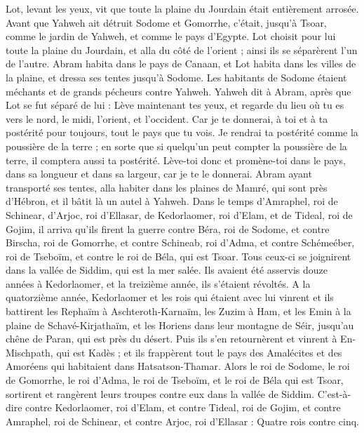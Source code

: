 \begin{multicols}{2}
Lot, levant les yeux, vit que toute la plaine du Jourdain était entièrement arrosée. Avant que Yahweh ait détruit Sodome et Gomorrhe, c’était, jusqu'à Tsoar, comme le jardin de Yahweh, et comme le pays d'Egypte.
Lot choisit pour lui toute la plaine du Jourdain, et alla du côté de l’orient ; ainsi ils se séparèrent l'un de l'autre.
Abram habita dans le pays de Canaan, et Lot habita dans les villes de la plaine, et dressa ses tentes jusqu'à Sodome.
Les habitants de Sodome étaient méchants et de grands pécheurs contre Yahweh.
Yahweh dit à Abram, après que Lot se fut séparé de lui : Lève maintenant tes yeux, et regarde du lieu où tu es vers le nord, le midi, l'orient, et l'occident.
Car je te donnerai, à toi et à ta postérité pour toujours, tout le pays que tu vois.
Je rendrai ta postérité comme la poussière de la terre ; en sorte que si quelqu'un peut compter la poussière de la terre, il comptera aussi ta postérité.
Lève-toi donc et promène-toi dans le pays, dans sa longueur et dans sa largeur, car je te le donnerai.
Abram ayant transporté ses tentes, alla habiter dans les plaines de Mamré, qui sont près d’Hébron, et il bâtit là un autel à Yahweh.
\VerseOne{}Dans le temps d'Amraphel, roi de Schinear, d'Arjoc, roi d'Ellasar, de Kedorlaomer, roi d'Elam, et de Tideal, roi de Gojim,
il arriva qu’ils firent la guerre contre Béra, roi de Sodome, et contre Birscha, roi de Gomorrhe, et contre Schineab, roi d'Adma, et contre Schémeéber, roi de Tseboïm, et contre le roi de Béla, qui est Tsoar.
Tous ceux-ci se joignirent dans la vallée de Siddim, qui est la mer salée.
Ils avaient été asservis douze années à Kedorlaomer, et la treizième année, ils s'étaient révoltés.
A la quatorzième année, Kedorlaomer et les rois qui étaient avec lui vinrent et ils battirent les Rephaïm à Aschteroth-Karnaïm, les Zuzim à Ham, et les Emin à la plaine de Schavé-Kirjathaïm,
et les Horiens dans leur montagne de Séir, jusqu'au chêne de Paran, qui est près du désert.
Puis ils s’en retournèrent et vinrent à En-Mischpath, qui est Kadès ; et ils frappèrent tout le pays des Amalécites et des Amoréens qui habitaient dans Hatsatson-Thamar.
Alors le roi de Sodome, le roi de Gomorrhe, le roi d'Adma, le roi de Tseboïm, et le roi de Béla qui est Tsoar, sortirent et rangèrent leurs troupes contre eux dans la vallée de Siddim.
C'est-à-dire contre Kedorlaomer, roi d'Elam, et contre Tideal, roi de Gojim, et contre Amraphel, roi de Schinear, et contre Arjoc, roi d'Ellasar : Quatre rois contre cinq.

\end{multicols}

